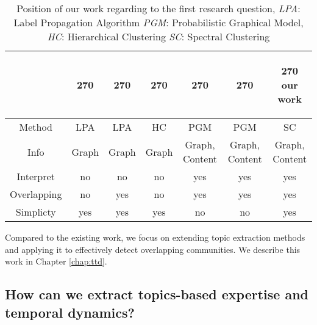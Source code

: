    \begin{table}[htp]
        \centering
        \begin{tabular}{c c c c c c c}
        &
        \begin{turn}{270}
            \cite{raghavan2007near} 
        \end{turn} 
        &
        \begin{turn}{270}
            \cite{DBLP:journals/csur/XieKS13} 
        \end{turn} 
        &
        \begin{turn}{270} 
            \cite{girvan2002community}
        \end{turn}
        &
        \begin{turn}{270} 
            \cite{yang2013community}
        \end{turn}
        &
        \begin{turn}{270}
            \cite{hu2014user}
        \end{turn}
        &
        
        \begin{turn}{270}
        our work
        \end{turn}
        \\ \hline
        Method &LPA & LPA & HC & PGM &PGM & SC\\ \hline
        Info  & Graph & Graph &Graph & Graph, Content & Graph, Content& Graph, Content\\ \hline
        Interpret& no & no & no & yes & yes & yes \\ \hline
        Overlapping & no & yes & no & yes & yes & yes \\ \hline
        Simplicty & yes & yes & yes & no & no & yes \\ \hline
        \end{tabular}
        \caption{Position of our work regarding to the first research question, \textit{LPA}: Label Propagation Algorithm \textit{PGM}: Probabilistic Graphical Model, \textit{HC}: Hierarchical Clustering \textit{SC}: Spectral Clustering}
        \label{tab:rq4compare}
    \end{table}
    Compared to the existing work, we focus on extending topic extraction methods and applying it to effectively detect overlapping communities. We describe this work in Chapter \ref{chap:ttd}.



    
\subsection{How can we extract topics-based expertise and temporal dynamics?}
    
